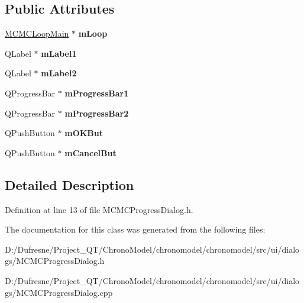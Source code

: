 \subsection*{Public Attributes}
\begin{DoxyCompactItemize}
\item 
\hypertarget{class_m_c_m_c_progress_dialog_a33ea058f62265feed02ef6537c31d335}{\hyperlink{class_m_c_m_c_loop_main}{M\-C\-M\-C\-Loop\-Main} $\ast$ {\bfseries m\-Loop}}\label{class_m_c_m_c_progress_dialog_a33ea058f62265feed02ef6537c31d335}

\item 
\hypertarget{class_m_c_m_c_progress_dialog_a568c6bd105cb10190f3f44c40f993a1c}{Q\-Label $\ast$ {\bfseries m\-Label1}}\label{class_m_c_m_c_progress_dialog_a568c6bd105cb10190f3f44c40f993a1c}

\item 
\hypertarget{class_m_c_m_c_progress_dialog_a97c290a08dee2c7aeeec006d81384732}{Q\-Label $\ast$ {\bfseries m\-Label2}}\label{class_m_c_m_c_progress_dialog_a97c290a08dee2c7aeeec006d81384732}

\item 
\hypertarget{class_m_c_m_c_progress_dialog_a20fa3c28a929801531bcc721ce26408b}{Q\-Progress\-Bar $\ast$ {\bfseries m\-Progress\-Bar1}}\label{class_m_c_m_c_progress_dialog_a20fa3c28a929801531bcc721ce26408b}

\item 
\hypertarget{class_m_c_m_c_progress_dialog_ae621d7e6d274cb03338f68886f0fa238}{Q\-Progress\-Bar $\ast$ {\bfseries m\-Progress\-Bar2}}\label{class_m_c_m_c_progress_dialog_ae621d7e6d274cb03338f68886f0fa238}

\item 
\hypertarget{class_m_c_m_c_progress_dialog_a942e8ff3b5fafcea4478dfa8616a0673}{Q\-Push\-Button $\ast$ {\bfseries m\-O\-K\-But}}\label{class_m_c_m_c_progress_dialog_a942e8ff3b5fafcea4478dfa8616a0673}

\item 
\hypertarget{class_m_c_m_c_progress_dialog_af1fae251a4791fd2c4823fe4ff73695c}{Q\-Push\-Button $\ast$ {\bfseries m\-Cancel\-But}}\label{class_m_c_m_c_progress_dialog_af1fae251a4791fd2c4823fe4ff73695c}

\end{DoxyCompactItemize}


\subsection{Detailed Description}


Definition at line 13 of file M\-C\-M\-C\-Progress\-Dialog.\-h.



The documentation for this class was generated from the following files\-:\begin{DoxyCompactItemize}
\item 
D\-:/\-Dufresne/\-Project\-\_\-\-Q\-T/\-Chrono\-Model/chronomodel/chronomodel/src/ui/dialogs/M\-C\-M\-C\-Progress\-Dialog.\-h\item 
D\-:/\-Dufresne/\-Project\-\_\-\-Q\-T/\-Chrono\-Model/chronomodel/chronomodel/src/ui/dialogs/M\-C\-M\-C\-Progress\-Dialog.\-cpp\end{DoxyCompactItemize}
